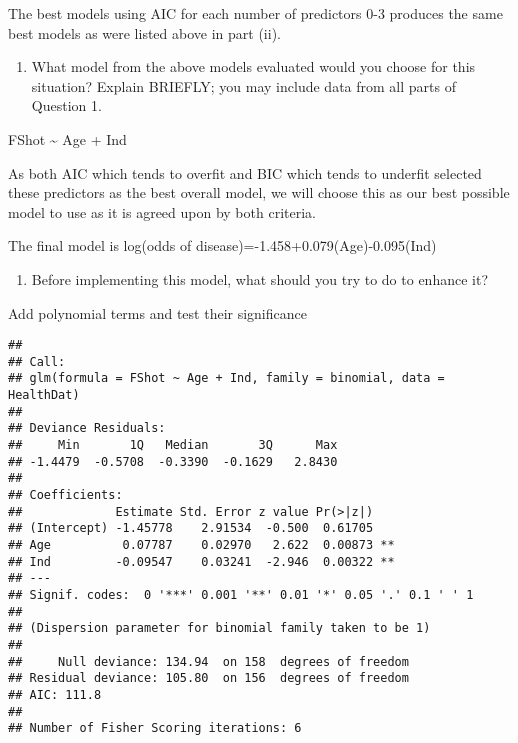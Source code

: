 \documentclass[]{article}
\newenvironment{Shaded}{\begin{snugshade}}{\end{snugshade}}
\newcommand{\KeywordTok}[1]{\textcolor[rgb]{0.13,0.29,0.53}{\textbf{#1}}}
\newcommand{\DataTypeTok}[1]{\textcolor[rgb]{0.13,0.29,0.53}{#1}}
\newcommand{\DecValTok}[1]{\textcolor[rgb]{0.00,0.00,0.81}{#1}}
\newcommand{\OperatorTok}[1]{\textcolor[rgb]{0.81,0.36,0.00}{\textbf{#1}}}
\newcommand{\NormalTok}[1]{#1}
\providecommand{\tightlist}{%
  \setlength{\itemsep}{0pt}\setlength{\parskip}{0pt}}
\begin{document}
The best models using AIC for each number of predictors 0-3 produces the
same best models as were listed above in part (ii).

\begin{enumerate}
\def\labelenumi{\alph{enumi})}
\setcounter{enumi}{21}
\tightlist
\item
  What model from the above models evaluated would you choose for this
  situation? Explain BRIEFLY; you may include data from all parts of
  Question 1.
\end{enumerate}

FShot \textasciitilde{} Age + Ind

As both AIC which tends to overfit and BIC which tends to underfit
selected these predictors as the best overall model, we will choose this
as our best possible model to use as it is agreed upon by both criteria.

The final model is log(odds of disease)=-1.458+0.079(Age)-0.095(Ind)

\begin{enumerate}
\def\labelenumi{\roman{enumi})}
\setcounter{enumi}{5}
\tightlist
\item
  Before implementing this model, what should you try to do to enhance
  it?
\end{enumerate}

Add polynomial terms and test their significance

\begin{Shaded}
\end{Shaded}

\begin{verbatim}
## 
## Call:
## glm(formula = FShot ~ Age + Ind, family = binomial, data = HealthDat)
## 
## Deviance Residuals: 
##     Min       1Q   Median       3Q      Max  
## -1.4479  -0.5708  -0.3390  -0.1629   2.8430  
## 
## Coefficients:
##             Estimate Std. Error z value Pr(>|z|)   
## (Intercept) -1.45778    2.91534  -0.500  0.61705   
## Age          0.07787    0.02970   2.622  0.00873 **
## Ind         -0.09547    0.03241  -2.946  0.00322 **
## ---
## Signif. codes:  0 '***' 0.001 '**' 0.01 '*' 0.05 '.' 0.1 ' ' 1
## 
## (Dispersion parameter for binomial family taken to be 1)
## 
##     Null deviance: 134.94  on 158  degrees of freedom
## Residual deviance: 105.80  on 156  degrees of freedom
## AIC: 111.8
## 
## Number of Fisher Scoring iterations: 6
\end{verbatim}
\end{document}

